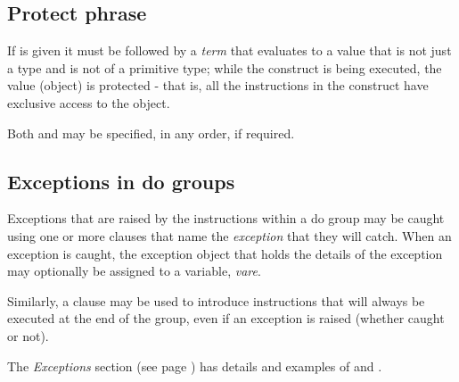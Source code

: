 \subsection{Protect phrase}
 
If  is given it must be followed by a \emph{term}
that evaluates to a value that is not just a type and is not of a
primitive type; while the  construct is being executed, the
value (object) is protected - that is, all the instructions in the
 construct have exclusive access to the object.
 
Both  and  may be specified, in any order,
if required.
\subsection{Exceptions in do groups}
 
Exceptions that are raised by the instructions within a do group may be
caught using one or more  clauses that name the
\emph{exception} that they will catch.
When an exception is caught, the exception object that holds the details
of the exception may optionally be assigned to a variable,
\emph{vare}.
 
Similarly, a  clause may be used to introduce
instructions that will always be executed at the end of the group, even
if an exception is raised (whether caught or not).
 
The  \emph{Exceptions} section (see page \pageref{refexcep})  has details and
examples of  and .
\index{,}

